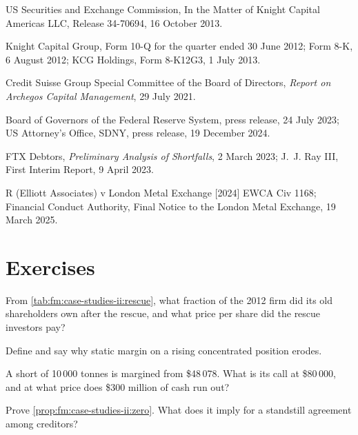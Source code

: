 \begin{omsources}
\item US Securities and Exchange Commission, In the Matter of Knight Capital Americas LLC, Release 34-70694, 16 October 2013.
\item Knight Capital Group, Form 10-Q for the quarter ended 30 June 2012; Form 8-K, 6 August 2012; KCG Holdings, Form 8-K12G3, 1 July 2013.
\item Credit Suisse Group Special Committee of the Board of Directors, \emph{Report on Archegos Capital Management}, 29 July 2021.
\item Board of Governors of the Federal Reserve System, press release, 24 July 2023; US Attorney's Office, SDNY, press release, 19 December 2024.
\item FTX Debtors, \emph{Preliminary Analysis of Shortfalls}, 2 March 2023; J.~J. Ray III, First Interim Report, 9 April 2023.
\item R (Elliott Associates) v London Metal Exchange [2024] EWCA Civ 1168; Financial Conduct Authority, Final Notice to the London Metal Exchange,
19 March 2025.
\end{omsources}

\section{Exercises}

\begin{exercise}[$\star$]\label{exo:fm:case-studies-ii:1}
From \cref{tab:fm:case-studies-ii:rescue}, what fraction of the 2012 firm did its old shareholders own after the rescue, and what price per share
did the rescue investors pay?
\end{exercise}

\begin{exercise}[$\star$]\label{exo:fm:case-studies-ii:2}
Define  and say why static margin on a rising concentrated position erodes.
\end{exercise}

\begin{exercise}[$\star$]\label{exo:fm:case-studies-ii:3}
A short of 10\,000 tonnes is margined from \$48\,078. What is its call at \$80\,000, and at what price does \$300 million of cash run out?
\end{exercise}

\begin{exercise}[$\star\star$]\label{exo:fm:case-studies-ii:4}
Prove \cref{prop:fm:case-studies-ii:zero}. What does it imply for a standstill agreement among creditors?
\end{exercise}

